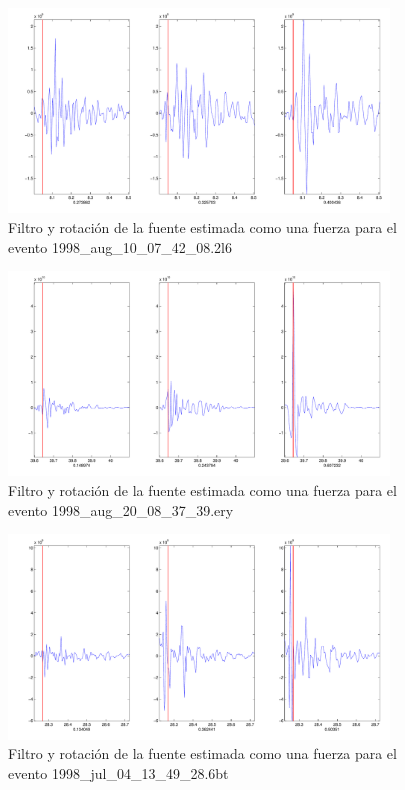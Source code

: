 \begin{figure}[H]
\includegraphics[width=0.9\textwidth,height=0.4\textheight]{linea_timerev/figuras/plotSrcEv4filtrotsrc.pdf}
\caption{Filtro y rotación de la fuente estimada como una fuerza para el
evento 1998\_aug\_10\_07\_42\_08.2l6}
\end{figure}
\begin{figure}[H]
\includegraphics[width=0.9\textwidth,height=0.4\textheight]{linea_timerev/figuras/plotSrcEv5filtrotsrc.pdf}
\caption{Filtro y rotación de la fuente estimada como una fuerza para el
evento 1998\_aug\_20\_08\_37\_39.ery}
\end{figure}
\begin{figure}[H]
\includegraphics[width=0.9\textwidth,height=0.4\textheight]{linea_timerev/figuras/plotSrcEv6filtrotsrc.pdf}
\caption{Filtro y rotación de la fuente estimada como una fuerza para el
evento 1998\_jul\_04\_13\_49\_28.6bt}
\end{figure}
